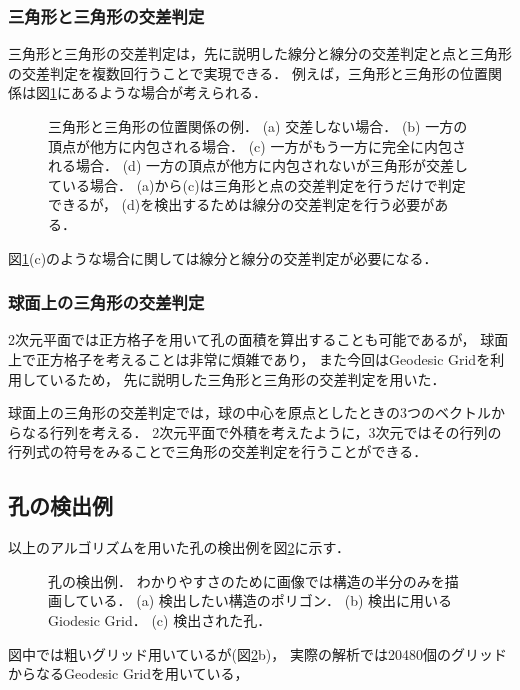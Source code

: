 \subsubsection{三角形と三角形の交差判定}
三角形と三角形の交差判定は，先に説明した線分と線分の交差判定と点と三角形の交差判定を複数回行うことで実現できる．
例えば，三角形と三角形の位置関係は図\ref{fig:triangle_triangle}にあるような場合が考えられる．
\begin{figure}
    \centering
    
    \caption{
        三角形と三角形の位置関係の例．
        (a) 交差しない場合．
        (b) 一方の頂点が他方に内包される場合．
        (c) 一方がもう一方に完全に内包される場合．
        (d) 一方の頂点が他方に内包されないが三角形が交差している場合．
            (a)から(c)は三角形と点の交差判定を行うだけで判定できるが，
            (d)を検出するためは線分の交差判定を行う必要がある．
    }
    \label{fig:triangle_triangle}
\end{figure}
図\ref{fig:triangle_triangle}(c)のような場合に関しては線分と線分の交差判定が必要になる．


\subsubsection{球面上の三角形の交差判定}
2次元平面では正方格子を用いて孔の面積を算出することも可能であるが，
球面上で正方格子を考えることは非常に煩雑であり，
また今回はGeodesic Gridを利用しているため，
先に説明した三角形と三角形の交差判定を用いた．

球面上の三角形の交差判定では，球の中心を原点としたときの3つのベクトルからなる行列を考える．
2次元平面で外積を考えたように，3次元ではその行列の行列式の符号をみることで三角形の交差判定を行うことができる．


\subsection{孔の検出例}
以上のアルゴリズムを用いた孔の検出例を図\ref{fig:hole_detection}に示す．
\begin{figure}
    \centering
    
    \caption{
        孔の検出例．
        わかりやすさのために画像では構造の半分のみを描画している．
        (a) 検出したい構造のポリゴン．
        (b) 検出に用いるGiodesic Grid．
        (c) 検出された孔．
    }
    \label{fig:hole_detection}
\end{figure}
図中では粗いグリッド用いているが(図\ref{fig:hole_detection}b)，
実際の解析では20480個のグリッドからなるGeodesic Gridを用いている，
